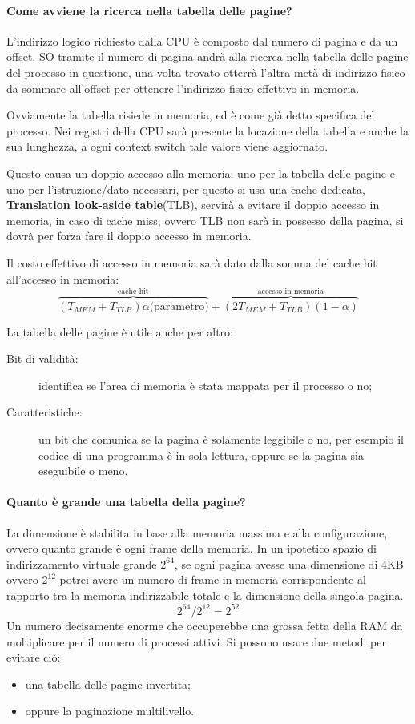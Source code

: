 \documentclass[a4paper, 12pt]{book}
\begin{document}
\paragraph{Come avviene la ricerca nella tabella delle pagine?}
L'indirizzo logico richiesto dalla CPU è composto dal numero
di pagina e da un offset, SO tramite il numero di pagina 
andrà alla ricerca nella tabella delle pagine del processo
in questione, una volta trovato otterrà l'altra metà di 
indirizzo fisico da sommare all'offset per ottenere 
l'indirizzo fisico effettivo in memoria.

Ovviamente la tabella risiede in memoria, ed è come già detto 
specifica del processo. Nei registri della CPU sarà presente 
la locazione della tabella e anche la sua lunghezza, a ogni context 
switch tale valore viene aggiornato.

Questo causa un doppio accesso alla memoria: uno per 
la tabella delle pagine e uno per l'istruzione/dato necessari, per 
questo si usa una cache dedicata, \textbf{Translation look-aside table}(TLB), 
servirà a evitare il doppio accesso in memoria, in caso 
di cache miss, ovvero TLB non sarà in possesso della pagina, si 
dovrà per forza fare il doppio accesso in memoria.

Il costo effettivo di accesso in memoria sarà dato dalla 
somma del cache hit all'accesso in memoria:
\[
    \overbrace{(T_{MEM} + T_{TLB})\alpha\textrm{(parametro)}}^{\textrm{cache hit}} + \overbrace{(2T_{MEM} + T_{TLB})(1 - \alpha)}^{\textrm{accesso in memoria}}
\]

La tabella delle pagine è utile anche per altro:
\begin{description}
    \item[Bit di validità:] identifica se l'area di memoria 
    è stata mappata per il processo o no;
    \item[Caratteristiche:] un bit che comunica se la pagina
    è solamente leggibile o no, per esempio il codice di una programma
    è in sola lettura, oppure se la pagina sia eseguibile o meno.
\end{description}

\paragraph{Quanto è grande una tabella della pagine?}
La dimensione è stabilita in base alla memoria massima e alla configurazione,
ovvero quanto grande è ogni frame della memoria. In un ipotetico spazio di indirizzamento
virtuale grande $2^{64}$, se ogni pagina avesse una dimensione di 4KB ovvero $2^{12}$ potrei 
avere un numero di frame in memoria corrispondente al rapporto tra la memoria indirizzabile totale e
la dimensione della singola pagina. 
\[
    2^{64} / 2^{12} = 2^{52}
\]
Un numero decisamente enorme che occuperebbe una grossa fetta della RAM da moltiplicare per il 
numero di processi attivi. Si possono usare due metodi per evitare ciò:
\begin{itemize}
    \item una tabella delle pagine invertita;
    \item oppure la paginazione multilivello.
\end{itemize}
\end{document}
